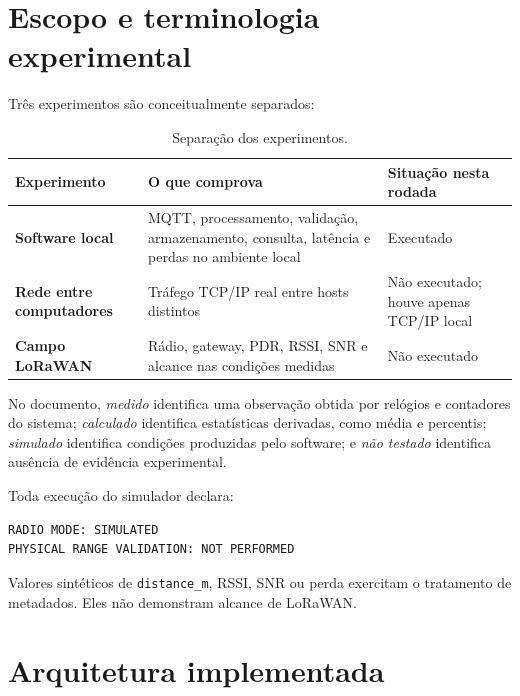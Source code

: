 \documentclass[12pt,a4paper]{article}
\newcommand{\code}[1]{\texttt{#1}}
\begin{document}
\section{Escopo e terminologia experimental}

Três experimentos são conceitualmente separados:

\begin{table}[htbp]
\centering
\caption{Separação dos experimentos.}
\begin{tabularx}{\textwidth}{>{\bfseries}p{3cm} X X}
\toprule
Experimento & O que comprova & Situação nesta rodada \\
\midrule
Software local & MQTT, processamento, validação, armazenamento, consulta, latência e perdas no ambiente local & Executado \\
Rede entre computadores & Tráfego TCP/IP real entre hosts distintos & Não executado; houve apenas TCP/IP local \\
Campo LoRaWAN & Rádio, gateway, PDR, RSSI, SNR e alcance nas condições medidas & Não executado \\
\bottomrule
\end{tabularx}
\end{table}

No documento, \emph{medido} identifica uma observação obtida por relógios e contadores do sistema; \emph{calculado} identifica estatísticas derivadas, como média e percentis; \emph{simulado} identifica condições produzidas pelo software; e \emph{não testado} identifica ausência de evidência experimental.

Toda execução do simulador declara:

\begin{lstlisting}
RADIO MODE: SIMULATED
PHYSICAL RANGE VALIDATION: NOT PERFORMED
\end{lstlisting}

Valores sintéticos de \code{distance\_m}, RSSI, SNR ou perda exercitam o tratamento de metadados. Eles não demonstram alcance de LoRaWAN.

\section{Arquitetura implementada}
\end{document}
